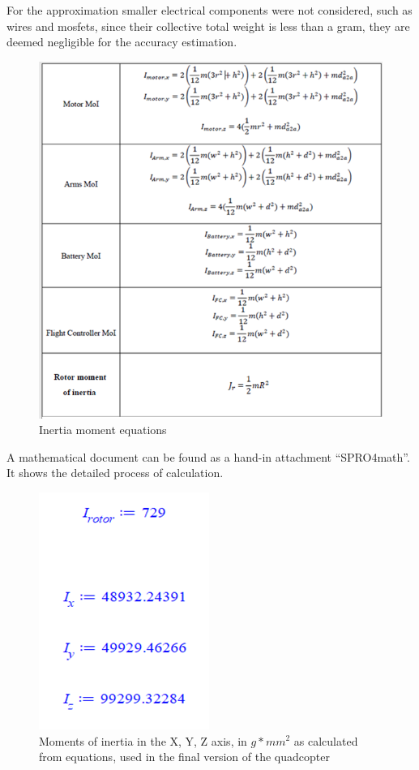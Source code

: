 For the approximation smaller electrical components were not considered, such as wires and mosfets, since their collective total weight is less than a gram, they are deemed negligible for the accuracy estimation.

\begin{figure}[H]
\begin{center}
   \includegraphics[scale =0.87]{pictures/control/inertia tables table.png}
\end{center}
\caption{Inertia moment equations \cite{Ferry}}
\end{figure}

A mathematical document can be found as a hand-in attachment “SPRO4math”. It shows the detailed process of calculation.
\begin{figure}[H]
\begin{center}
   \includegraphics[scale =1]{pictures/control/Inertia moments.png}
\end{center}
\caption{Moments of inertia in the X, Y, Z axis, in $g*mm^2$ as calculated from equations, used in the final version of the quadcopter}
\end{figure}

